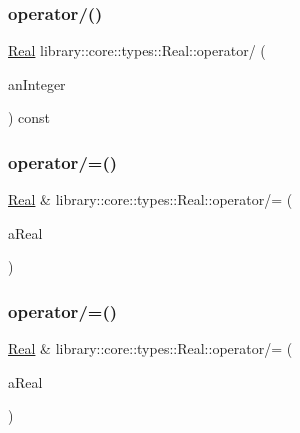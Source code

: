 \subsubsection{\texorpdfstring{operator/()}{operator/()}\hspace{0.1cm}{\footnotesize\ttfamily [3/3]}}
{\footnotesize\ttfamily \hyperlink{classlibrary_1_1core_1_1types_1_1_real}{Real} library\+::core\+::types\+::\+Real\+::operator/ (\begin{DoxyParamCaption}\item[{const \hyperlink{classlibrary_1_1core_1_1types_1_1_integer}{Integer} \&}]{an\+Integer }\end{DoxyParamCaption}) const}

\mbox{\label{classlibrary_1_1core_1_1types_1_1_real_adc661a93f109f10500738a77439c975d}} 
\subsubsection{\texorpdfstring{operator/=()}{operator/=()}\hspace{0.1cm}{\footnotesize\ttfamily [1/2]}}
{\footnotesize\ttfamily \hyperlink{classlibrary_1_1core_1_1types_1_1_real}{Real} \& library\+::core\+::types\+::\+Real\+::operator/= (\begin{DoxyParamCaption}\item[{const \hyperlink{classlibrary_1_1core_1_1types_1_1_real}{Real} \&}]{a\+Real }\end{DoxyParamCaption})}

\mbox{\label{classlibrary_1_1core_1_1types_1_1_real_a6a9a6530460f746c7e7fdbba3b6932fe}} 
\subsubsection{\texorpdfstring{operator/=()}{operator/=()}\hspace{0.1cm}{\footnotesize\ttfamily [2/2]}}
{\footnotesize\ttfamily \hyperlink{classlibrary_1_1core_1_1types_1_1_real}{Real} \& library\+::core\+::types\+::\+Real\+::operator/= (\begin{DoxyParamCaption}\item[{const \hyperlink{classlibrary_1_1core_1_1types_1_1_real_a9c5c8826b7e5a8e39544d23fea6c0e1c}{Real\+::\+Value\+Type} \&}]{a\+Real }\end{DoxyParamCaption})}

